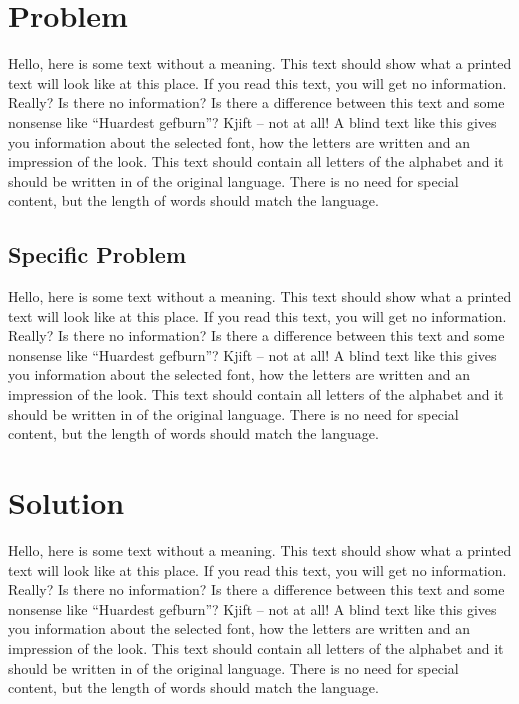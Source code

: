 \documentclass[%
  english,%
  todotools=true,%
  trtype=proceedings%
]{hpitr}
\begin{document}
\section{Problem}
\label{sec:problem}

Hello, here is some text without a meaning. This text should show
what a printed text will look like at this place. If you read this
text, you will get no information. Really? Is there no information?
Is there a difference between this text and some nonsense like
“Huardest gefburn”? Kjift – not at all! A blind text like this gives
you information about the selected font, how the letters are written
and an impression of the look. This text should contain all letters
of the alphabet and it should be written in of the original
language. There is no need for special content, but the length of
words should match the language.~\cite{953350}

\subsection{Specific Problem}
\label{sec:specific-problem}

Hello, here is some text without a meaning. This text should show
what a printed text will look like at this place. If you read this
text, you will get no information. Really? Is there no information?
Is there a difference between this text and some nonsense like
“Huardest gefburn”? Kjift – not at all! A blind text like this gives
you information about the selected font, how the letters are written
and an impression of the look. This text should contain all letters
of the alphabet and it should be written in of the original
language. There is no need for special content, but the length of
words should match the language.

\section{Solution}
\label{sec:solution}

%
Hello, here is some text without a meaning. This text should show
what a printed text will look like at this place. If you read this
text, you will get no information. Really? Is there no information?
Is there a difference between this text and some nonsense like
“Huardest gefburn”? Kjift – not at all! A blind text like this gives
you information about the selected font, how the letters are written
and an impression of the look. This text should contain all letters
of the alphabet and it should be written in of the original
language. There is no need for special content, but the length of
words should match the language.
\end{document}
